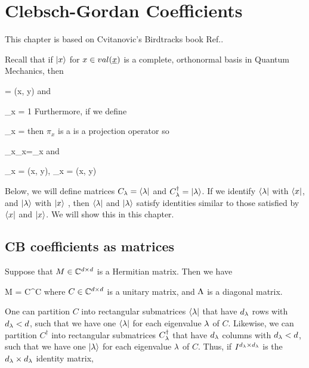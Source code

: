 \chapter{Clebsch-Gordan Coefficients}
\label{ch-clebsch-gordan}
This chapter is based on
Cvitanovic's Birdtracks book Ref.\cite{birdtracks-book}.


Recall that if $|x\rangle$ for
$x\in val(\rvx)$ is a complete, orthonormal
basis in Quantum Mechanics, then

\beq
{} =  \delta(x, y)
\quad
{}
\eeq
and

\beq
\sum_x  = 1
\quad
{}
\eeq
Furthermore, if we define

\beq
\pi_x = 
\eeq
then $\pi_x$ is a
is a projection operator so

\beq
\pi_x\pi_x=\pi_x
\eeq
and

\beq
\pi_x =  
\delta(x, y),\quad
{}\pi_x = 
\delta(x, y)
\eeq

Below, we will
define matrices $C_\lambda=\langle\lambda|$ and $C^\dagger_\lambda = |\lambda\rangle$.
If we identify $\langle\lambda|$
with $\langle x|$,
and $|\lambda\rangle$
with
$|x\rangle$
, then $\langle\lambda|$ and $|\lambda\rangle$
satisfy identities
similar to those satisfied by $\langle x|$ and $|x\rangle$. 
We will show this
in this chapter.

\section{CB coefficients as matrices}


Suppose that  $M\in{ \mathbb{C}}^{d\times d}$ is a Hermitian matrix. Then we have

\beq
M = C^\dagger \Lam C
\eeq
where 
$C\in { \mathbb{C}}^{d\times d}$ is a unitary matrix, and $\Lambda$ is a diagonal matrix.



One can partition 
$C$ into rectangular submatrices $\langle\lambda|$ that have  $d_\lambda$ rows with $d_\lambda < d$, 
such that we have one $\langle\lambda|$
for each eigenvalue $\lambda$ of $C$.
Likewise, we can partition 
$C^\dagger$ into rectangular submatrices $C^\dagger_\lambda$ that have $d_\lambda$ columns with $d_\lambda < d$, such that we have one $|\lambda\rangle$
for each eigenvalue $\lambda$ of $C$. Thus, if $I^{d_\lambda\times d_\lambda}$
is the $d_\lambda\times d_\lambda$
identity matrix,


